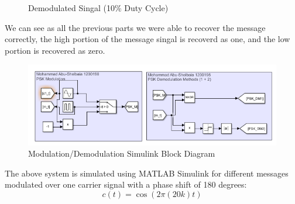\documentclass[12pt]{article}
\begin{document}
\begin{figure}[H]
    \centering
    \caption{Demodulated Singal (10\% Duty Cycle)}
\end{figure}
We can see as all the previous parts we were able to recover the message correctly, the high portion of the message singal is recoverd as one, and the low portion is recovered as zero.
\begin{figure}[H]
    \centering
    \includegraphics[width=1\textwidth]{assets//main/2023-08-27-17-34-24.png}
    \caption{Modulation/Demodulation Simulink Block Diagram}
\end{figure}
The above system is simulated using MATLAB Simulink for different messages modulated over one carrier signal with a phase shift of 180 degrees:
\begin{equation}
    c(t) = \cos(2\pi(20k)t)
\end{equation}
\end{document}
